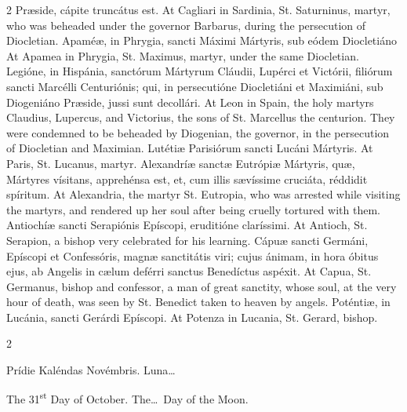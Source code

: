 \begin{paracol}{2}
 Præside, cápite truncátus est.
\switchcolumn
{}
At Cagliari in Sardinia, St. 
 Saturninus, martyr, who was beheaded under the governor Barbarus, during the 
 persecution of Diocletian.
\switchcolumn*
{}
Apaméæ, in Phrygia, 
 sancti Máximi Mártyris, sub eódem Diocletiáno
\switchcolumn
{}
At Apamea in Phrygia, St. Maximus, 
 martyr, under the same Diocletian.
\switchcolumn*
{}
Legióne, in Hispánia, 
 sanctórum Mártyrum Cláudii, Lupérci et Victórii, filiórum sancti Marcélli 
 Centuriónis; qui, in persecutióne Diocletiáni et Maximiáni, sub Diogeniáno 
 Præside, jussi sunt decollári.
\switchcolumn
{}
At Leon in Spain, the holy martyrs 
 Claudius, Lupercus, and Victorius, the sons of St. Marcellus the centurion. 
 They were condemned to be beheaded by Diogenian, the governor, in the 
 persecution of Diocletian and Maximian.
\switchcolumn*
{}
Lutétiæ Parisiórum 
 sancti Lucáni Mártyris.
\switchcolumn
{}
At Paris, St. Lucanus, martyr.
\switchcolumn*
{}
Alexandríæ sanctæ 
 Eutrópiæ Mártyris, quæ, Mártyres vísitans, apprehénsa est, et, cum illis 
 sævíssime cruciáta, réddidit spíritum.
\switchcolumn
{}
At Alexandria, the martyr St. 
 Eutropia, who was arrested while visiting the martyrs, and rendered up her 
 soul after being cruelly tortured with them.
\switchcolumn*
{}
Antiochíæ sancti 
 Serapiónis Epíscopi, eruditióne claríssimi.
\switchcolumn
{}
At Antioch, St. Serapion, a bishop 
 very celebrated for his learning.
\switchcolumn*
{}
Cápuæ sancti Germáni, 
 Epíscopi et Confessóris, magnæ sanctitátis viri; cujus ánimam, in hora 
 óbitus ejus, ab Angelis in cælum deférri sanctus Benedíctus aspéxit.
\switchcolumn
{}
At Capua, St. Germanus, bishop and 
 confessor, a man of great sanctity, whose soul, at the very hour of death, 
 was seen by St. Benedict taken to heaven by angels.
\switchcolumn*
{}
Poténtiæ, in Lucánia, 
 sancti Gerárdi Epíscopi.
\switchcolumn
{}
At Potenza in Lucania, St. Gerard, 
 bishop.
\switchcolumn*
{}
\end{paracol}


\begin{paracol}{2}
\begin{center}{\color{gregoriocolor} Prídie Kaléndas Novémbris. 
 Luna\dots\ }\end{center}
\switchcolumn
{}
\begin{center}{\color{gregoriocolor} The 
 31\textsuperscript{st} Day of 
 October. The\dots\ Day of the Moon.}\end{center}
\end{paracol}

